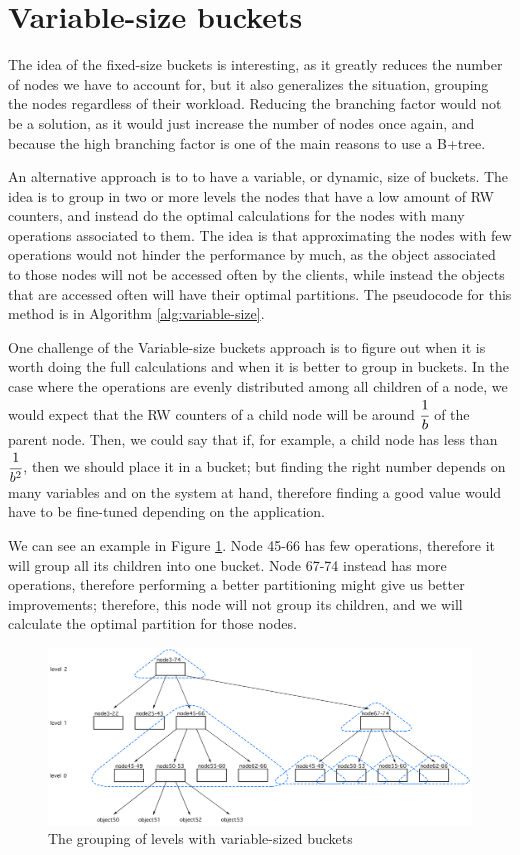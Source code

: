 \section{Variable-size buckets}\label{sec:Variable-size buckets}
The idea of the fixed-size buckets is interesting, as it greatly reduces the number of nodes we have to account for, but it also generalizes the situation, grouping the nodes regardless of their workload. Reducing the branching factor would not be a solution, as it would just increase the number of nodes once again, and because the high branching factor is one of the main reasons to use a B+tree. 

An alternative approach is to to have a variable, or dynamic, size of buckets. The idea is to group in two or more levels the nodes that have a low amount of RW counters, and instead do the optimal calculations for the nodes with many operations associated to them. The idea is that approximating the nodes with few operations would not hinder the performance by much, as the object associated to those nodes will not be accessed often by the clients, while instead the objects that are accessed often will have their optimal partitions. 
The pseudocode for this method is in Algorithm \ref{alg:variable-size}.


One challenge of the Variable-size buckets approach is to figure out when it is worth doing the full calculations and when it is better to group in buckets. In the case where the operations are evenly distributed among all children of a node, we would expect that the RW counters of a child node will be around $\cfrac{1}{b}$ of the parent node. Then, we could say that if, for example, a child node has less than $\cfrac{1}{b^2}$, then we should place it in a bucket; but finding the right number depends on many variables and on the system at hand, therefore finding a good value would have to be fine-tuned depending on the application.

We can see an example in Figure \ref{fig:Variable-size-buckets}. Node 45-66 has few operations, therefore it will group all its children into one bucket. Node 67-74 instead has more operations, therefore performing a better partitioning might give us better improvements; therefore, this node will not group its children, and we will calculate the optimal partition for those nodes. 

\begin{figure}[!htb]
  \centering
  \includegraphics[width=\textwidth,height=\textheight,keepaspectratio]{img/dynamic-buckets.png}
  \caption{ The grouping of levels with variable-sized buckets}
  \label{fig:Variable-size-buckets}
\end{figure}

